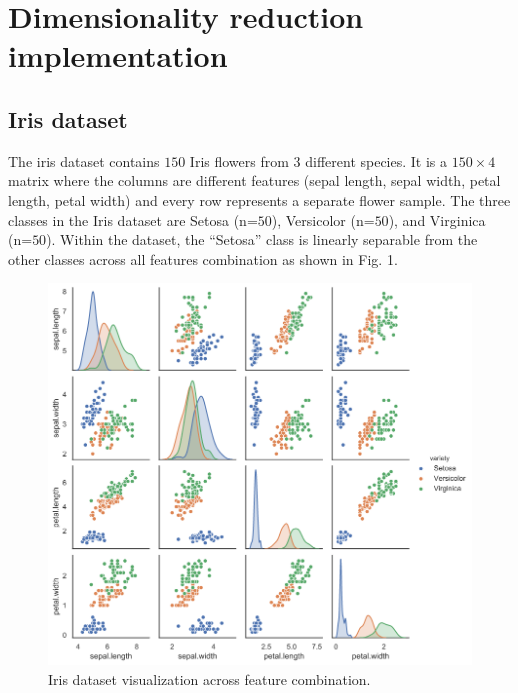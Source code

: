 \documentclass[conference]{IEEEtran}
\begin{document}
\section{Dimensionality reduction implementation}
\subsection{Iris dataset}
The iris dataset contains $150$ Iris flowers from $3$ different species. It is a $150\times 4$ matrix where the columns are different features (sepal length, sepal width, petal length, petal width) and every row represents a separate flower sample. The three classes in the Iris dataset are Setosa (n=$50$), Versicolor (n=$50$), and Virginica (n=$50$). Within the dataset, the “Setosa” class is linearly separable from the other classes across all features combination as shown in Fig. 1. 
\begin{figure}[h]
\centerline{\includegraphics[scale=0.3]{Figures/pair_plot.png}}
\caption{Iris dataset visualization across feature combination.}
\label{fig}
\end{figure}
\end{document}
